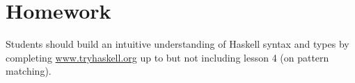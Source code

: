 \documentclass[11pt]{article}
\begin{document}
\section*{Homework}

Students should build an intuitive understanding of Haskell syntax and types
by completing \url{www.tryhaskell.org} up to but not including lesson 4 (on
pattern matching).
\end{document}
